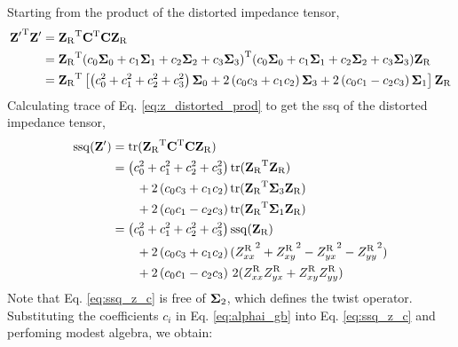 	Starting from the product of the distorted impedance tensor,
	\begin{equation}\label{eq:z_distorted_prod}
		\begin{split}
			\transpose{{\ZbfDistorted}} \ZbfDistorted & = \transpose{\ZbfUndistorted}\transpose{\Cbf}\Cbf\ZbfUndistorted \\
			& = \transpose{\ZbfUndistorted}\transpose{(\cZero\SigmaZero+\cOne\SigmaOne + \cTwo\SigmaTwo + \cThree\SigmaThree)} (\cZero\SigmaZero+\cOne\SigmaOne + \cTwo\SigmaTwo + \cThree\SigmaThree)\ZbfUndistorted \\
			& =  \transpose{\ZbfUndistorted}\left[ \left(\cZero^2+\cOne^2+\cTwo^2+\cThree^2 \right)\SigmaZero + 2\left( \cZero\cThree + \cOne\cTwo \right) \SigmaThree + 2\left( \cZero\cOne - \cTwo\cThree \right)\SigmaOne \right] \ZbfUndistorted
		\end{split}
	\end{equation}
	Calculating trace of Eq. \eqref{eq:z_distorted_prod} to get the ssq of the distorted impedance tensor,
	\begin{equation}\label{eq:ssq_z_c}
		\begin{split}
		\ssq(\ZbfDistorted) & = \tracefunc{\transpose{\ZbfUndistorted}\transpose{\Cbf}\Cbf\ZbfUndistorted} \\
		& = \left(\cZero^2+\cOne^2+\cTwo^2+\cThree^2 \right) \tracefunc{\transpose{\ZbfUndistorted}\ZbfUndistorted} \\ 
		& \quad\quad + 2\left( \cZero\cThree + \cOne\cTwo \right) \tracefunc{\transpose{\ZbfUndistorted}\SigmaThree\ZbfUndistorted} \\
		& \quad\quad + 2\left( \cZero\cOne - \cTwo\cThree \right)\tracefunc{\transpose{\ZbfUndistorted}\SigmaOne\ZbfUndistorted} \\
		& = \left(\cZero^2+\cOne^2+\cTwo^2+\cThree^2 \right) \ssq(\ZbfUndistorted) \\
		& \quad\quad + 2\left( \cZero\cThree + \cOne\cTwo \right) ({\ZxxR}^2+{\ZxyR}^2-{\ZyxR}^2-{\ZyyR}^2) \\
		& \quad\quad + 2\left( \cZero\cOne - \cTwo\cThree \right) \, 2(\ZxxR\ZyxR+\ZxyR\ZyyR)		
		\end{split}
	\end{equation}
	Note that Eq. \eqref{eq:ssq_z_c} is free of $\mathbf{\Sigma}_2$, which defines the twist operator.
%
	Substituting the coefficients $c_i$ in Eq. \eqref{eq:alphai_gb} into Eq. \eqref{eq:ssq_z_c} and perfoming modest algebra, we obtain:
